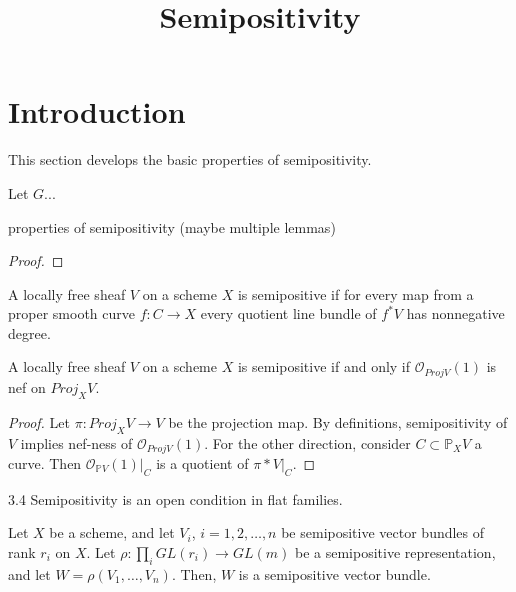 


\newcommand{\todo}[1]{\footnote{\textbf{TODO.} #1}}

\title{Semipositivity}
\maketitle


\section{Introduction}
This section develops the basic properties of semipositivity.


\begin{definition}
Let $G$...
\end{definition}

\begin{lemma}
properties of semipositivity (maybe multiple lemmas)
\end{lemma}


\begin{proof}

\end{proof}


\begin{definition}
A locally free sheaf $V$ on a scheme $X$ is semipositive if for every map from a proper smooth curve $f:C\to X$ every quotient line bundle of $f^*V$ has nonnegative degree.
\end{definition}

\begin{lemma}
A locally free sheaf $V$ on a scheme $X$ is semipositive if and only if $\mathcal{O}_{Proj V}(1)$ is nef on $Proj_XV$.
\end{lemma}
\begin{proof}
Let $\pi: Proj_X V\to V$ be the projection map. By definitions, semipositivity of $V$ implies nef-ness of $\mathcal{O}_{Proj V}(1)$. For the other direction, consider $C\subset \mathbb{P}_XV$ a curve. Then $\mathcal{O}_{\mathbb{P}V}(1)|_C$ is a quotient of $\pi*V|_C$. 
\end{proof}

\begin{lemma}
3.4 Semipositivity is an open condition in flat families.
\end{lemma}

\begin{lemma}\label{apply_rho_still_semipos}
Let $X$ be a scheme, and let $V_i$, $i=1,2,\ldots,n$ be semipositive vector bundles of rank $r_i$ on $X$. Let $\rho:\prod_i GL(r_i)\to GL(m)$ be a semipositive representation, and let $W=\rho(V_1,\ldots,V_n)$. Then, $W$ is a semipositive vector bundle.
\end{lemma}


